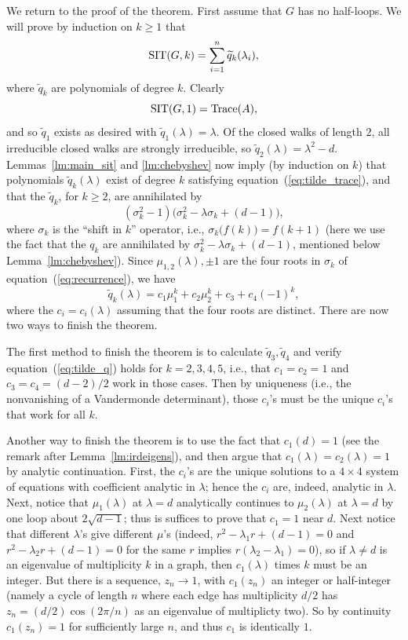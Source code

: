 \documentclass[12pt]{article}
\newcommand{\sit}{{\rm SIT}}
\begin{document}
We return to the proof of the theorem.  
First assume that $G$ has no half-loops.
We will prove by induction on $k\ge1$
that
\begin{equation}\label{eq:tilde_trace}
\sit(G,k)=\sum_{i=1}^n \widetilde q_k(\lambda_i),
\end{equation}
where $\widetilde q_k$ are polynomials of degree $k$.
Clearly
$$
\sit(G,1)={\rm Trace}(A),
$$
and so $\widetilde q_1$ exists as desired with
$\widetilde q_1(\lambda)=\lambda$.  Of the closed walks of length $2$, all
irreducible closed walks are strongly irreducible, so $\widetilde q_2(\lambda)
=\lambda^2-d$.
Lemmas~\ref{lm:main_sit} and \ref{lm:chebyshev} now imply (by induction on
$k$) that
polynomials $\widetilde q_k(\lambda)$ exist of degree $k$ satisfying
equation~(\ref{eq:tilde_trace}), and that the $\widetilde q_k$, for 
$k\ge 2$, are
annihilated by
\begin{equation}\label{eq:recurrence}
(\sigma_k^2-1)\bigl(\sigma_k^2-\lambda\sigma_k+(d-1)\bigr),
\end{equation}
where $\sigma_k$ is the ``shift in $k$'' operator, i.e., 
$\sigma_k\bigl( f(k) \bigr)=f(k+1)$ (here we use the fact that the $q_k$
are annihilated by $\sigma_k^2-\lambda\sigma_k+(d-1)$, mentioned below
Lemma~\ref{lm:chebyshev}).
Since $\mu_{1,2}(\lambda),\pm 1$ are the four roots in $\sigma_k$ 
of equation~(\ref{eq:recurrence}), we have
$$
\widetilde q_k(\lambda) = c_1\mu_1^k+c_2\mu_2^k+c_3+c_4(-1)^k,
$$
where the $c_i=c_i(\lambda)$ assuming that the four roots are distinct.
There are now two ways to finish the theorem.

The first method to finish the theorem is to calculate
$\widetilde q_3,\widetilde q_4$ and verify equation~(\ref{eq:tilde_q}) 
holds for $k=2,3,4,5$, i.e.,
that $c_1=c_2=1$ and $c_3=c_4=(d-2)/2$ work in those cases.  Then by
uniqueness (i.e., the nonvanishing of a Vandermonde determinant),
those $c_i$'s must be the unique $c_i$'s that work for all $k$.

Another way to finish the theorem is to use 
the fact that $c_1(d)=1$ (see the remark after
Lemma~\ref{lm:irdeigens}), and then argue that $c_1(\lambda)=c_2(\lambda)=1$
by analytic continuation.  First, the $c_i$'s are the unique solutions to a
$4\times 4$ system of equations with coefficient analytic in $\lambda$;
hence the $c_i$ are, indeed, analytic in $\lambda$.  Next,
notice that $\mu_1(\lambda)$ at
$\lambda=d$ analytically continues to $\mu_2(\lambda)$ at $\lambda=d$
by one loop about $2\sqrt{d-1}$; thus is suffices to prove that $c_1=1$
near $d$.  
Next notice that different $\lambda$'s give different $\mu$'s
(indeed, $r^2-\lambda_1r
+(d-1)=0$ and $r^2-\lambda_2 r+(d-1)=0$ for the same $r$ implies
$r(\lambda_2-\lambda_1)=0$), so if $\lambda\ne d$ is an eigenvalue of 
multiplicity $k$ in a graph, then $c_1(\lambda)$ times $k$ must be 
an integer.
But there is a sequence, $z_n\to 1$, with $c_1(z_n)$ an integer
or half-integer (namely a cycle of length $n$
where each edge has multiplicity $d/2$
has $z_n=(d/2)\cos(2\pi/n)$ as an eigenvalue of multiplicty two).
So by continuity $c_1(z_n)=1$
for sufficiently large $n$, and thus $c_1$ is identically $1$.
\end{document}
